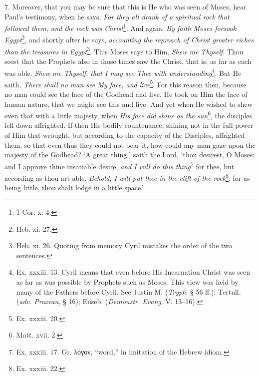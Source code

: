 7. Moreover, that you may be sure that this is He who was seen of Moses, hear Paul’s testimony, when he says, \emph{For they all drank of a spiritual rock that followed them; and the rock was Christ}\footnote{1 Cor. x. 4.}. And again: \emph{By faith Moses forsook Egypt}\footnote{Heb. xi. 27.}, and shortly after he says, \emph{accounting the reproach of Christ greater riches than the treasures in Egypt}\footnote{Heb. xi. 26. Quoting from memory Cyril mistakes the order of the two sentences.}. This Moses says to Him, \emph{Shew me Thyself}. Thou seest that the Prophets also in those times saw the Christ, that is, as far as each was able.\emph{ Shew me Thyself, that I may see Thee with understanding}\footnote{Ex. xxxiii. 13. Cyril means that even before His Incarnation Christ was seen as far as was possible by Prophets such as Moses. This view was held by many of the Fathers before Cyril. See Justin M. (\emph{Tryph}. § 56 ff.); Tertull. (\emph{adv. Praxean}, § 16); Euseb. (\emph{Demonstr. Evang}. V. 13–16).}. But He saith, \emph{There shall no man see My face, and live}\footnote{Ex. xxxiii. 20.}. For this reason then, because no man could see the face of the Godhead and live, He took on Him the face of human nature, that we might see this and live. And yet when He wished to shew even that with a little majesty, when \emph{His face did shine as the sun}\footnote{Matt. xvii. 2.}, the disciples fell down affrighted. If then His bodily countenance, shining not in the full power of Him that wrought, but according to the capacity of the Disciples, affrighted them, so that even thus they could not bear it, how could any man gaze upon the majesty of the Godhead? ‘A great thing,’ saith the Lord, ‘thou desirest, O Moses: and I approve thine insatiable desire, \emph{and I will do this thing}\footnote{Ex. xxxiii. 17. Gr. \textgreek{λόγον}, “word,” in imitation of the Hebrew idiom.} for thee, but according as thou art able. \emph{Behold, I will put thee in the clift of the rock}\footnote{Ex. xxxiii. 22.}: for as being little, thou shalt lodge in a little space.’

